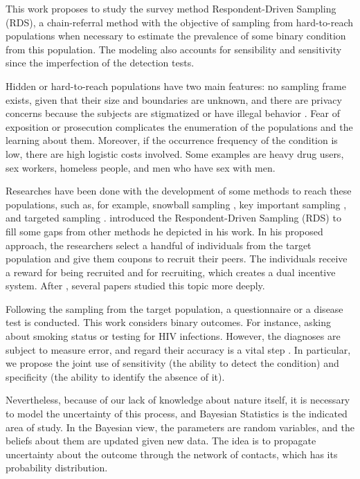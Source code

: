 
This work proposes to study the survey method Respondent-Driven Sampling (RDS), a chain-referral method with the objective of sampling from hard-to-reach populations when necessary to estimate the prevalence of some binary condition from this population. The modeling also accounts for sensibility and sensitivity since the imperfection of the detection tests.  

Hidden or hard-to-reach populations have two main features: no sampling frame
exists, given that their size and boundaries are unknown, and there are
privacy concerns because the subjects are stigmatized or have illegal behavior
\cite{heckathorn1997}. Fear of exposition or prosecution complicates the
enumeration of the populations and the learning about them. Moreover, if the
occurrence frequency of the condition is low, there are high logistic costs
involved. Some examples are heavy drug users, sex workers, homeless people,
and men who have sex with men. 

Researches have been done with the development of some methods to reach these
populations, such as, for example, snowball sampling \cite{goodman1961}, key
important sampling \cite{deaux-callaghan1985}, 
and targeted sampling \cite{watters-biernacki1989}. \citeauthor{heckathorn1997} introduced the Respondent-Driven Sampling (RDS) to
fill some gaps from other methods he depicted in his work. In his proposed
approach, the researchers select a handful of individuals from the target
population and give them coupons to recruit their peers. The individuals
receive a reward for being recruited and for recruiting, which creates a dual
incentive system. After \citeyear{heckathorn1997}, several papers studied this
topic more deeply. 

Following the sampling from the target population, a questionnaire or a
disease test is conducted. This work considers binary outcomes. For
instance, asking about smoking status or testing for HIV infections. However,
the diagnoses are subject to measure error, and regard their accuracy is a
vital step \cite{reitsma2005bivariate}. In particular, we propose the joint
use of sensitivity (the ability to detect the condition) and specificity (the
ability to identify the absence of it).  

Nevertheless, because of our lack of knowledge about nature itself, it is
necessary to model the uncertainty of this process, and Bayesian Statistics is
the indicated area of study. In the Bayesian view, the parameters are random
variables, and the beliefs about them are updated given new data. The idea is
to propagate uncertainty about the outcome through the network of contacts,
which has its probability distribution.

